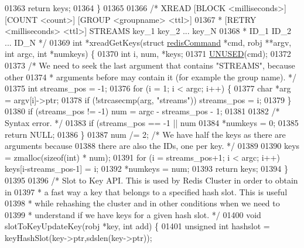 \begin{DoxyCode}
01363     \textcolor{keywordflow}{return} keys;
01364 \}
01365 
01366 \textcolor{comment}{/* XREAD [BLOCK <milliseconds>] [COUNT <count>] [GROUP <groupname> <ttl>]}
01367 \textcolor{comment}{ *       [RETRY <milliseconds> <ttl>] STREAMS key\_1 key\_2 ... key\_N}
01368 \textcolor{comment}{ *       ID\_1 ID\_2 ... ID\_N */}
01369 \textcolor{keywordtype}{int} *xreadGetKeys(\textcolor{keyword}{struct} \hyperlink{structredisCommand}{redisCommand} *cmd, robj **argv, \textcolor{keywordtype}{int} argc, \textcolor{keywordtype}{int} *numkeys) \{
01370     \textcolor{keywordtype}{int} i, num, *keys;
01371     \hyperlink{server_8h_ae7c9dc8f13568a9c856573751f1ee1ec}{UNUSED}(cmd);
01372 
01373     \textcolor{comment}{/* We need to seek the last argument that contains "STREAMS", because other}
01374 \textcolor{comment}{     * arguments before may contain it (for example the group name). */}
01375     \textcolor{keywordtype}{int} streams\_pos = -1;
01376     \textcolor{keywordflow}{for} (i = 1; i < argc; i++) \{
01377         \textcolor{keywordtype}{char} *arg = argv[i]->ptr;
01378         \textcolor{keywordflow}{if} (!strcasecmp(arg, \textcolor{stringliteral}{"streams"})) streams\_pos = i;
01379     \}
01380     \textcolor{keywordflow}{if} (streams\_pos != -1) num = argc - streams\_pos - 1;
01381 
01382     \textcolor{comment}{/* Syntax error. */}
01383     \textcolor{keywordflow}{if} (streams\_pos == -1 || num %
01384         *numkeys = 0;
01385         \textcolor{keywordflow}{return} NULL;
01386     \}
01387     num /= 2; \textcolor{comment}{/* We have half the keys as there are arguments because}
01388 \textcolor{comment}{                 there are also the IDs, one per key. */}
01389 
01390     keys = zmalloc(\textcolor{keyword}{sizeof}(\textcolor{keywordtype}{int}) * num);
01391     \textcolor{keywordflow}{for} (i = streams\_pos+1; i < argc; i++) keys[i-streams\_pos-1] = i;
01392     *numkeys = num;
01393     \textcolor{keywordflow}{return} keys;
01394 \}
01395 
01396 \textcolor{comment}{/* Slot to Key API. This is used by Redis Cluster in order to obtain in}
01397 \textcolor{comment}{ * a fast way a key that belongs to a specified hash slot. This is useful}
01398 \textcolor{comment}{ * while rehashing the cluster and in other conditions when we need to}
01399 \textcolor{comment}{ * understand if we have keys for a given hash slot. */}
01400 \textcolor{keywordtype}{void} slotToKeyUpdateKey(robj *key, \textcolor{keywordtype}{int} add) \{
01401     \textcolor{keywordtype}{unsigned} \textcolor{keywordtype}{int} hashslot = keyHashSlot(key->ptr,sdslen(key->ptr));

\end{DoxyCode}
